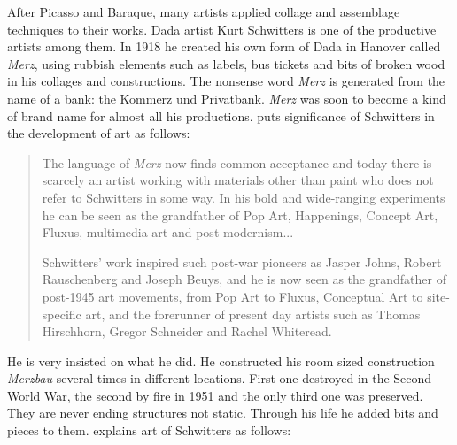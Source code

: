 After Picasso and Baraque, many artists applied collage and assemblage techniques to their works. Dada artist Kurt Schwitters is one of the productive artists among them. In 1918 he created his own form of Dada in Hanover called \textit{Merz}, using rubbish elements such as labels, bus tickets and bits of broken wood in his collages and constructions. The nonsense word \textit{Merz} is generated from the name of a bank: the Kommerz und Privatbank. \textit{Merz} was soon to become a kind of brand name for almost all his productions. \cite{webster2011kurt} puts significance of Schwitters in the development of art as follows:

\begin{quote}
The language of \textit{Merz} now finds common acceptance and today there is scarcely an artist working with materials other than paint who does not refer to Schwitters in some way. In his bold and wide-ranging experiments he can be seen as the grandfather of Pop Art, Happenings, Concept Art, Fluxus, multimedia art and post-modernism...

Schwitters’ work inspired such post-war pioneers as Jasper Johns, Robert Rauschenberg and Joseph Beuys, and he is now seen as the grandfather of post-1945 art movements, from Pop Art to Fluxus, Conceptual Art to site-specific art, and the forerunner of present day artists such as Thomas Hirschhorn, Gregor Schneider and Rachel Whiteread.
\end{quote}

He is very insisted on what he did. He constructed his room sized construction \textit{Merzbau} several times in different locations. First one destroyed in the Second World War, the second by fire in 1951 and the only third one was preserved. They are never ending structures not static. Through his life he added bits and pieces to them. \cite{carroll2011ruin} explains art of Schwitters as follows:

